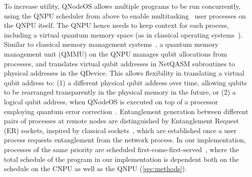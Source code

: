 To increase utility, QNodeOS allows multiple programs to be run concurrently, using the QNPU scheduler from above to enable multitasking~\cite{mccullough_design_1965-1,dennis_segmentation_1965} user processes on the QNPU itself. The QNPU hence needs to keep context for each process, including a virtual quantum memory space (as in classical operating systems~\cite{daley_virtual_1968-1}). Similar to classical memory management systems~\cite{peterson_operating_1985}, a quantum memory management unit (QMMU) on the QNPU manages qubit allocations from processes, and translates virtual qubit addresses in NetQASM subroutines to physical addresses in the QDevice. This allows flexibility in translating a virtual qubit address to: (1) a different physical qubit address over time, allowing qubits to be rearranged transparently in the physical memory in the future, or (2) a logical qubit address, when QNodeOS is executed on top of a processor employing quantum error correction~\cite{lidar2013quantum}. Entanglement generation between different pairs of processes at remote nodes are distinguished by Entanglement Request (ER) sockets, inspired by classical sockets~\cite{chesson_network_1975-1,leach_architecture_1983}, which are established once a user process requests entanglement from the network process. In our implementation, processes of the same priority are scheduled first-come-first-served~\cite{peterson_operating_1985}, where the total schedule of the program in our implementation is dependent both on the schedule on the CNPU as well as the QNPU (\cref{sec:methods}).

